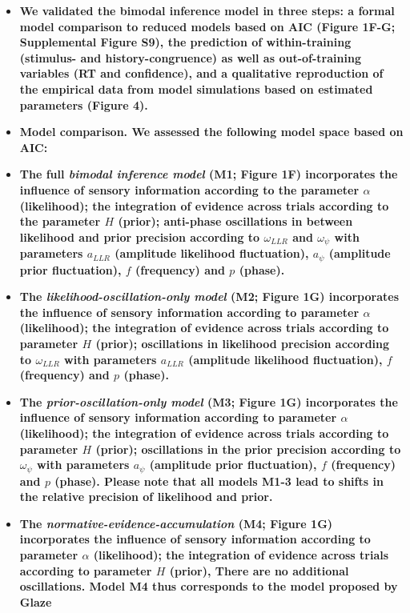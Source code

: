 \documentclass[
]{article}
\begin{document}
\begin{itemize}
\item
  \textbf{We validated the bimodal inference model in three steps: a
  formal model comparison to reduced models based on AIC (Figure 1F-G;
  Supplemental Figure S9), the prediction of within-training (stimulus-
  and history-congruence) as well as out-of-training variables (RT and
  confidence), and a qualitative reproduction of the empirical data from
  model simulations based on estimated parameters (Figure 4).}
\item
  \textbf{Model comparison. We assessed the following model space based
  on AIC:}
\item
  \textbf{The full \emph{bimodal inference model} (M1; Figure 1F)
  incorporates the influence of sensory information according to the
  parameter \(\alpha\) (likelihood); the integration of evidence across
  trials according to the parameter \(H\) (prior); anti-phase
  oscillations in between likelihood and prior precision according to
  \(\omega_{LLR}\) and \(\omega_{\psi}\) with parameters \(a_{LLR}\)
  (amplitude likelihood fluctuation), \(a_{\psi}\) (amplitude prior
  fluctuation), \(f\) (frequency) and \(p\) (phase).}
\item
  \textbf{The \emph{likelihood-oscillation-only model} (M2; Figure 1G)
  incorporates the influence of sensory information according to
  parameter \(\alpha\) (likelihood); the integration of evidence across
  trials according to parameter \(H\) (prior); oscillations in
  likelihood precision according to \(\omega_{LLR}\) with parameters
  \(a_{LLR}\) (amplitude likelihood fluctuation), \(f\) (frequency) and
  \(p\) (phase).}
\item
  \textbf{The \emph{prior-oscillation-only model} (M3; Figure 1G)
  incorporates the influence of sensory information according to
  parameter \(\alpha\) (likelihood); the integration of evidence across
  trials according to parameter \(H\) (prior); oscillations in the prior
  precision according to \(\omega_{\psi}\) with parameters \(a_{\psi}\)
  (amplitude prior fluctuation), \(f\) (frequency) and \(p\) (phase).
  Please note that all models M1-3 lead to shifts in the relative
  precision of likelihood and prior.}
\item
  \textbf{The \emph{normative-evidence-accumulation} (M4; Figure 1G)
  incorporates the influence of sensory information according to
  parameter \(\alpha\) (likelihood); the integration of evidence across
  trials according to parameter \(H\) (prior), There are no additional
  oscillations. Model M4 thus corresponds to the model proposed by Glaze
}
\end{itemize}
\end{document}
